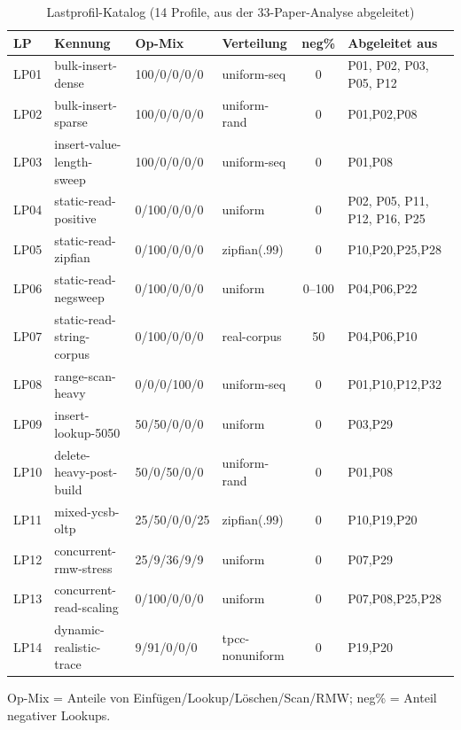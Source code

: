 \begin{nurlang}
\begin{table}[!htbp]
  \caption{Lastprofil-Katalog (14 Profile, aus der 33-Paper-Analyse abgeleitet)}\label{tab:lp-catalog}
  \centering\footnotesize
  \begin{tabular}{@{}l p{3.3cm} l l c p{2.4cm}@{}}
    \toprule
    \textbf{LP} & \textbf{Kennung} & \textbf{Op-Mix} & \textbf{Verteilung} & \textbf{neg\%} & \textbf{Abgeleitet aus} \\
    \midrule
    LP01 & bulk-insert-dense & 100/0/0/0/0 & uniform-seq & 0 & P01, P02, P03, P05, P12 \\
    LP02 & bulk-insert-sparse & 100/0/0/0/0 & uniform-rand & 0 & P01,P02,P08 \\
    LP03 & insert-value-length-sweep & 100/0/0/0/0 & uniform-seq & 0 & P01,P08 \\
    LP04 & static-read-positive & 0/100/0/0/0 & uniform & 0 & P02, P05, P11, P12, P16, P25 \\
    LP05 & static-read-zipfian & 0/100/0/0/0 & zipfian(.99) & 0 & P10,P20,P25,P28 \\
    LP06 & static-read-negsweep & 0/100/0/0/0 & uniform & 0--100 & P04,P06,P22 \\
    LP07 & static-read-string-corpus & 0/100/0/0/0 & real-corpus & 50 & P04,P06,P10 \\
    LP08 & range-scan-heavy & 0/0/0/100/0 & uniform-seq & 0 & P01,P10,P12,P32 \\
    LP09 & insert-lookup-5050 & 50/50/0/0/0 & uniform & 0 & P03,P29 \\
    LP10 & delete-heavy-post-build & 50/0/50/0/0 & uniform-rand & 0 & P01,P08 \\
    LP11 & mixed-ycsb-oltp & 25/50/0/0/25 & zipfian(.99) & 0 & P10,P19,P20 \\
    LP12 & concurrent-rmw-stress & 25/9/36/9/9 & uniform & 0 & P07,P29 \\
    LP13 & concurrent-read-scaling & 0/100/0/0/0 & uniform & 0 & P07,P08,P25,P28 \\
    LP14 & dynamic-realistic-trace & 9/91/0/0/0 & tpcc-nonuniform & 0 & P19,P20 \\
    \bottomrule
  \end{tabular}

  \smallskip
  {\footnotesize Op-Mix = Anteile von Einfügen/Lookup/Löschen/Scan/RMW\@; neg\% = Anteil negativer Lookups.\par}
\end{table}
\end{nurlang}


